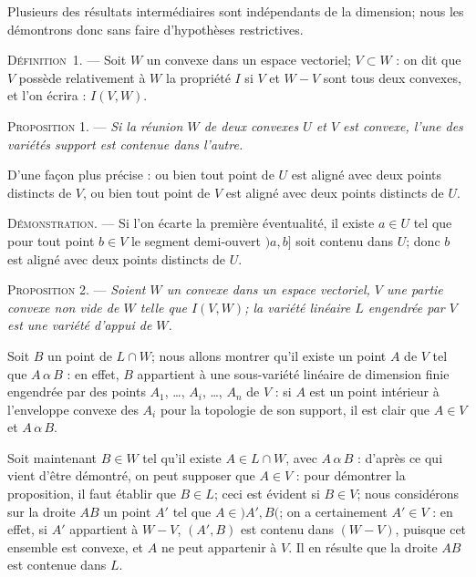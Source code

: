 \documentclass[11pt]{article}
\newcommand{\bznum}[1]{\if\relax\detokenize{#1}\relax\else\ #1\fi}
\newenvironment{defin}[1][]{\par\medskip\noindent\textsc{Définition\bznum{#1}.} --- }{\par\medskip}
\newenvironment{prop}[1][]{\par\medskip\noindent\textsc{Proposition #1.} --- \itshape}{\par\medskip}
\newenvironment{proof}[1][]{\par}{\par}
\begin{document}
Plusieurs des résultats intermédiaires sont indépendants de la dimension; nous les démontrons donc
sans faire d'hypothèses restrictives.

\begin{defin}[1]
Soit $W$ un convexe dans un espace vectoriel; $V\subset W$ : on dit que $V$ possède relativement à
$W$ la propriété $I$ si $V$ et $W-V$ sont tous deux convexes, et l'on écrira :
$I(V, W)$.
\end{defin}

\begin{prop}[1]
Si la réunion $W$ de deux convexes $U$ et $V$ est convexe, l'une des variétés support est contenue
dans l'autre.

D'une façon plus précise : ou bien tout point de $U$ est aligné avec deux points distincts de
$V$, ou bien tout point de $V$ est aligné avec deux points distincts de $U$.
\end{prop}

\begin{proof}
\textsc{Démonstration.} --- Si l'on écarte la première éventualité, il existe $a\in U$ tel que pour
tout point $b\in V$ le segment demi-ouvert $)a, b]$ soit contenu dans $U$; donc $b$ est aligné
avec deux points distincts de $U$.
\end{proof}

\begin{prop}[2]
Soient $W$ un convexe dans un espace vectoriel, $V$ une partie convexe non vide de $W$ telle que
$I(V, W)$; la variété linéaire $L$ engendrée par $V$ est une variété d'appui de $W$.
\end{prop}

\begin{proof}
Soit $B$ un point de $L\cap W$; nous allons montrer qu'il existe un point $A$ de $V$ tel que
$A\,\alpha\,B$ : en effet, $B$ appartient à une sous-variété linéaire de dimension finie engendrée
par des points $A_1$, \ldots, $A_i$, \ldots, $A_n$ de $V$ : si $A$ est un point intérieur à
l'enveloppe convexe des $A_i$ pour la topologie de son support, il est clair que $A\in V$ et
$A\,\alpha\,B$.

Soit maintenant $B\in W$ tel qu'il existe $A\in L\cap W$, avec $A\,\alpha\,B$ : d'après ce qui
vient d'être démontré, on peut supposer que $A\in V$ : pour démontrer la proposition, il faut
établir que $B\in L$; ceci est évident si $B\in V$; nous considérons sur la droite $AB$ un point
$A'$ tel que $A\in)A', B($; on a certainement $A'\in V$ : en effet, si $A'$ appartient à
$W-V$, $(A', B)$ est contenu dans $(W-V)$, puisque cet ensemble est convexe, et $A$ ne peut
appartenir à $V$. Il en résulte que la droite $AB$ est contenue dans $L$.
\end{proof}
\end{document}

